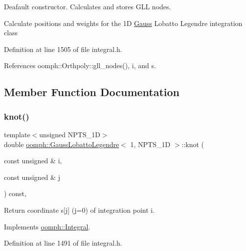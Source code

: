 Deafault constructor. Calculates and stores G\+LL nodes. 

Calculate positions and weights for the 1D \hyperlink{classoomph_1_1Gauss}{Gauss} Lobatto Legendre integration class 

Definition at line 1505 of file integral.\+h.



References oomph\+::\+Orthpoly\+::gll\+\_\+nodes(), i, and s.



\subsection{Member Function Documentation}
\mbox{\label{classoomph_1_1GaussLobattoLegendre_3_011_00_01NPTS__1D_01_4_ac5f35d0a83a52c37dab7578c06fca9cc}} 
\subsubsection{\texorpdfstring{knot()}{knot()}}
{\footnotesize\ttfamily template$<$unsigned N\+P\+T\+S\+\_\+1D$>$ \\
double \hyperlink{classoomph_1_1GaussLobattoLegendre}{oomph\+::\+Gauss\+Lobatto\+Legendre}$<$ 1, N\+P\+T\+S\+\_\+1D $>$\+::knot (\begin{DoxyParamCaption}\item[{const unsigned \&}]{i,  }\item[{const unsigned \&}]{j }\end{DoxyParamCaption}) const\hspace{0.3cm}{\ttfamily [inline]}, {\ttfamily [virtual]}}



Return coordinate s\mbox{[}j\mbox{]} (j=0) of integration point i. 



Implements \hyperlink{classoomph_1_1Integral_a1a2122f99a87c18649bafdd9ed739758}{oomph\+::\+Integral}.



Definition at line 1491 of file integral.\+h.



